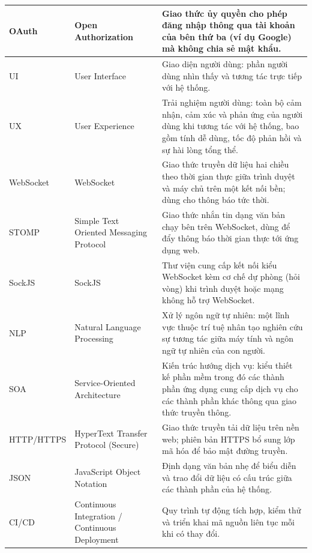 \begin{longtable}{|L{0.18\textwidth}|L{0.27\textwidth}|L{0.49\textwidth}|}
OAuth & Open Authorization & Giao thức ủy quyền cho phép đăng nhập thông qua tài khoản của bên thứ ba (ví dụ Google) mà không chia sẻ mật khẩu. \\
\hline

UI & User Interface & Giao diện người dùng: phần người dùng nhìn thấy và tương tác trực tiếp với hệ thống. \\
\hline

UX & User Experience & Trải nghiệm người dùng: toàn bộ cảm nhận, cảm xúc và phản ứng của người dùng khi tương tác với hệ thống, bao gồm tính dễ dùng, tốc độ phản hồi và sự hài lòng tổng thể. \\
\hline

WebSocket & WebSocket & Giao thức truyền dữ liệu hai chiều theo thời gian thực giữa trình duyệt và máy chủ trên một kết nối bền; dùng cho thông báo tức thời. \\
\hline

STOMP & Simple Text Oriented Messaging Protocol & Giao thức nhắn tin dạng văn bản chạy bên trên WebSocket, dùng để đẩy thông báo thời gian thực tới ứng dụng web. \\
\hline

SockJS & SockJS & Thư viện cung cấp kết nối kiểu WebSocket kèm cơ chế dự phòng (hỏi vòng) khi trình duyệt hoặc mạng không hỗ trợ WebSocket. \\
\hline

NLP & Natural Language Processing & Xử lý ngôn ngữ tự nhiên: một lĩnh vực thuộc trí tuệ nhân tạo nghiên cứu sự tương tác giữa máy tính và ngôn ngữ tự nhiên của con người. \\
\hline

SOA & Service-Oriented Architecture & Kiến trúc hướng dịch vụ: kiểu thiết kế phần mềm trong đó các thành phần ứng dụng cung cấp dịch vụ cho các thành phần khác thông qua giao thức truyền thông. \\
\hline

HTTP/\newline{}HTTPS & HyperText Transfer Protocol (Secure) & Giao thức truyền tải dữ liệu trên nền web; phiên bản HTTPS bổ sung lớp mã hóa để bảo mật đường truyền. \\
\hline

JSON & JavaScript Object Notation & Định dạng văn bản nhẹ để biểu diễn và trao đổi dữ liệu có cấu trúc giữa các thành phần của hệ thống. \\
\hline

CI/CD & Continuous Integration / Continuous Deployment & Quy trình tự động tích hợp, kiểm thử và triển khai mã nguồn liên tục mỗi khi có thay đổi. \\
\hline


\end{longtable}
